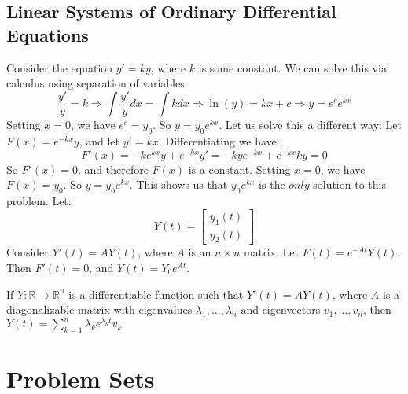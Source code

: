 \documentclass[crop=false,class=book,oneside]{standalone}                      %
\begin{document}
        \subsection{Linear Systems of Ordinary Differential Equations}
        Consider the equation $y' = ky$, where $k$ is some constant. We can solve this via calculus using separation of variables:
        \begin{equation*}
            \frac{y'}{y} = k\Rightarrow \int \frac{y'}{y}dx = \int kdx \Rightarrow \ln(y) = kx+c \Rightarrow y = e^c e^{kx}    
        \end{equation*}
        Setting $x=0$, we have $e^c = y_0$. So $y = y_0e^{kx}$. Let us solve this a different way: Let $F(x) = e^{-kx}y$, and let $y'=kx$. Differentiating we have:
        \begin{equation*}
            F'(x)=-ke^{kx}y+e^{-kx}y'=-kye^{-kx}+e^{-kx}ky=0    
        \end{equation*}
        So $F'(x) = 0$, and therefore $F(x)$ is a constant. Setting $x=0$, we have $F(x) = y_0$. So $y = y_0e^{kx}$. This shows us that $y_0e^{kx}$ is the $only$ solution to this problem. Let:
        \begin{equation*}
            Y(t) = \begin{bmatrix} y_1(t) \\ y_2(t)\end{bmatrix}    
        \end{equation*}
        Consider $Y'(t) = AY(t)$, where $A$ is an $n\times n$ matrix. Let $F(t) = e^{-At}Y(t)$. Then $F'(t) = 0$, and $Y(t) = Y_0 e^{At}$.
        \begin{theorem}
        If $Y:\mathbb{R}\rightarrow \mathbb{R}^n$ is a differentiable function such that $Y'(t) = AY(t)$, where $A$ is a diagonalizable matrix with eigenvalues $\lambda_1,\hdots, \lambda_n$ and eigenvectors $v_1,\hdots, v_n$, then $Y(t) = \sum_{k=1}^{n} \lambda_k e^{\lambda_k t}v_k$
        \end{theorem}
    \section{Problem Sets}
\end{document}
